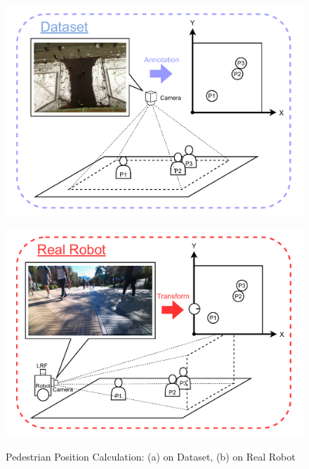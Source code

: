 \begin{figure}[H]
  \centering
  \begin{minipage}{0.85\textwidth}
    \centering
    \includegraphics[width=\linewidth]{images/ped2pos-dataset.pdf}
    \label{Fig:ped2pos-dataset}
  \end{minipage}
  \hfill
  \begin{minipage}{0.85\textwidth}
    \centering
    \includegraphics[width=\linewidth]{images/ped2pos-realrobot.pdf}
    \label{Fig:ped2pos-realrobot}
  \end{minipage}
  \caption{Pedestrian Position Calculation: (a) on Dataset, (b) on Real Robot}
  \label{Fig:ped2pos}
\end{figure}


